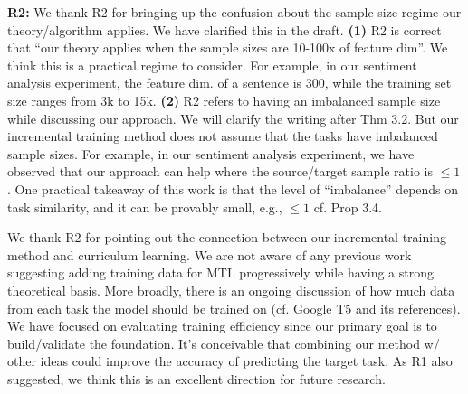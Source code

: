 \documentclass{article}
\begin{document}
\vspace{-0.02in}
\textbf{R2:}
We thank R2 for bringing up the confusion about the sample size regime our theory/algorithm applies. We have clarified this in the draft.
\textbf{(1)} R2 is correct that ``our theory applies when the sample sizes are 10-100x of feature dim''.
We think this is a practical regime to consider.
For example, in our sentiment analysis experiment, the feature dim. of a sentence is 300, while the training set size ranges from 3k to 15k.
\textbf{(2)} R2 refers to having an imbalanced sample size while discussing our approach. We will clarify the writing after Thm 3.2.
But our incremental training method does not assume that the tasks have imbalanced sample sizes. For example, in our sentiment analysis experiment, we have observed that our approach can help where the source/target sample ratio is $\le 1$.
One practical takeaway of this work is that the level of ``imbalance'' depends on task similarity, and it can be provably small, e.g., $\le 1$ cf. Prop 3.4.

\vspace{-0.06in}
We thank R2 for pointing out the connection between our incremental training method and curriculum learning.
We are not aware of any previous work suggesting adding training data for MTL progressively while having a strong theoretical basis.
More broadly, there is an ongoing discussion of how much data from each task the model should be trained on (cf. Google T5 and its references).
We have focused on evaluating training efficiency since our primary goal is to build/validate the foundation.
It's conceivable that combining our method w/ other ideas could improve the accuracy of predicting the target task.
As R1 also suggested, we think this is an excellent direction for future research.
\end{document}
